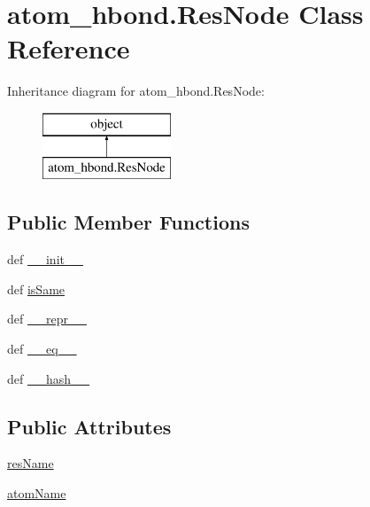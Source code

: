 \hypertarget{classatom__hbond_1_1_res_node}{\section{atom\-\_\-hbond.\-Res\-Node Class Reference}
\label{classatom__hbond_1_1_res_node}
}
Inheritance diagram for atom\-\_\-hbond.\-Res\-Node\-:\begin{figure}[H]
\begin{center}
\leavevmode
\includegraphics[height=2.000000cm]{classatom__hbond_1_1_res_node}
\end{center}
\end{figure}
\subsection*{Public Member Functions}
\begin{DoxyCompactItemize}
\item 
def \hyperlink{classatom__hbond_1_1_res_node_ad7da22ae1c6d68364e571b7b7f818cb1}{\-\_\-\-\_\-init\-\_\-\-\_\-}
\item 
def \hyperlink{classatom__hbond_1_1_res_node_a7d4b9aa1d615f1fdf7e1716948404b1a}{is\-Same}
\item 
def \hyperlink{classatom__hbond_1_1_res_node_a20413704596e1f492a2056602b759742}{\-\_\-\-\_\-repr\-\_\-\-\_\-}
\item 
def \hyperlink{classatom__hbond_1_1_res_node_a0b6c7a0f083bd384e039b09a7cf560a1}{\-\_\-\-\_\-eq\-\_\-\-\_\-}
\item 
def \hyperlink{classatom__hbond_1_1_res_node_a968af5a70cdc58c12b5d72908ba164f4}{\-\_\-\-\_\-hash\-\_\-\-\_\-}
\end{DoxyCompactItemize}
\subsection*{Public Attributes}
\begin{DoxyCompactItemize}
\item 
\hyperlink{classatom__hbond_1_1_res_node_ae1e370985c9c26c01024a282747c3585}{res\-Name}
\item 
\hyperlink{classatom__hbond_1_1_res_node_a21a674e4aa679f046f032954a4c4a254}{atom\-Name}
\end{DoxyCompactItemize}


